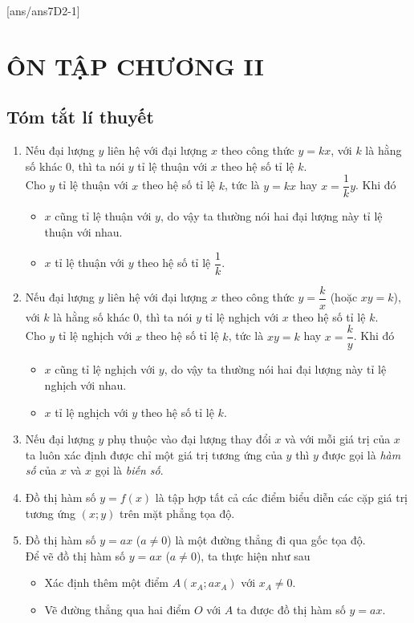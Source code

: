 [ans/ans7D2-1]
\section{ÔN TẬP CHƯƠNG II}
\subsection{Tóm tắt lí thuyết}
\begin{enumerate}[\tickEX]
	\item  Nếu đại lượng $y$ liên hệ với đại lượng $x$ theo công thức $y=kx$, với $k$ là hằng số khác $0$, thì ta nói $y$ tỉ lệ thuận với $x$ theo hệ số tỉ lệ $k$.\\
 Cho $y$ tỉ lệ thuận với $x$ theo hệ số tỉ lệ $k$, tức là $y=kx$ hay $x=\dfrac{1}{k}y$. Khi đó
 \begin{itemize}
  \item $x$ cũng tỉ lệ thuận với $y$, do vậy ta thường nói hai đại lượng này tỉ lệ thuận với nhau.
  \item $x$ tỉ lệ thuận với $y$ theo hệ số tỉ lệ $\dfrac{1}{k}$.
 \end{itemize}
	\item  Nếu đại lượng $y$ liên hệ với đại lượng $x$ theo công thức $y=\dfrac{k}{x}$ (hoặc $xy=k$), với $k$ là hằng số khác $0$, thì ta nói $y$ tỉ lệ nghịch với $x$ theo hệ số tỉ lệ $k$.\\
 Cho $y$ tỉ lệ nghịch với $x$ theo hệ số tỉ lệ $k$, tức là $xy=k$ hay $x=\dfrac{k}{y}$. Khi đó
 \begin{itemize}
  \item $x$ cũng tỉ lệ nghịch với $y$, do vậy ta thường nói hai đại lượng này tỉ lệ nghịch với nhau.
  \item $x$ tỉ lệ nghịch với $y$ theo hệ số tỉ lệ $k$.
 \end{itemize}
\item Nếu đại lượng $y$ phụ thuộc vào đại lượng thay đổi $x$ và với mỗi giá trị của $x$ ta luôn xác định được chỉ một giá trị tương ứng của $y$ thì $y$ được gọi là \textit{hàm số} của $x$ và $x$ gọi là \textit{biến số}.
\item Đồ thị hàm số $ y = f(x) $ là tập hợp tất cả các điểm biểu diễn các cặp giá trị tương ứng $ \left( x; y \right) $ trên mặt phẳng tọa độ.
\item Đồ thị hàm số $ y = ax $ ($ a \ne 0 $) là một đường thẳng đi qua gốc tọa độ.\\
Để vẽ đồ thị hàm số $ y = ax $ ($ a \ne 0 $), ta thực hiện như sau
\begin{itemize}
	\item Xác định thêm một điểm $ A\left(x_A;ax_A \right) $ với $ x_A \ne 0. $
	\item Vẽ đường thẳng qua hai điểm $ O $ với $A $ ta được đồ thị hàm số $ y = ax. $
\end{itemize} 
\end{enumerate}
